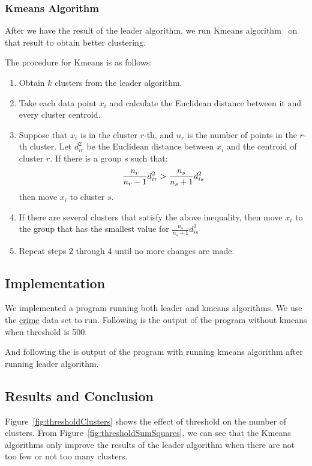 \documentclass{article}
\begin{document}
\subsubsection{Kmeans Algorithm}
After we have the result of the leader algorithm, we run Kmeans
algorithm~\cite{MartinezComputationalStatsMATLAB} on that result to obtain
better clustering.

The procedure for Kmeans is as follows:
\begin{enumerate}
  \item Obtain $k$ clusters from the leader algorithm.
  \item Take each data point $x_i$ and calculate the Euclidean distance between
  it and every cluster centroid.
  \item Suppose that $x_i$ is in the cluster $r$-th, and $n_r$ is the number of
  points in the $r$-th cluster. Let $d^2_{ir}$ be the Euclidean distance
  between $x_i$ and the centroid of cluster $r$. If there is a group $s$ such
  that:
  \begin{equation}
  \frac{n_r}{n_r-1}d^2_{ir}> \frac{n_s}{n_s+1}d^2_{is}\notag
  \end{equation}
	then move $x_i$ to cluster $s$.
  \item If there are several clusters that satisfy the above inequality, then
  move $x_i$ to the group that has the smallest value for
  $\frac{n_s}{n_s+1}d^2_{is}$
  \item Repeat steps 2 through 4 until no more changes are made.
\end{enumerate}
\subsection{Implementation}\label{sec:implementation}
We implemented a program running both leader and kmeans algorithms. We
use the \href{}{crime} data set to run. Following is the output of the program
without kmeans when threshold is 500. 

And following the is output of the program with running kmeans algorithm after
running leader algorithm.

\subsection{Results and Conclusion}
Figure~\ref{fig:thresholdClusters} shows the effect of threshold on the
number of clusters. From Figure~\ref{fig:thresholdSumSquares}, we can see that
the Kmeans algorithms only improve the results of the leader algorithm when
there are not too few or not too many clusters.
\end{document}
